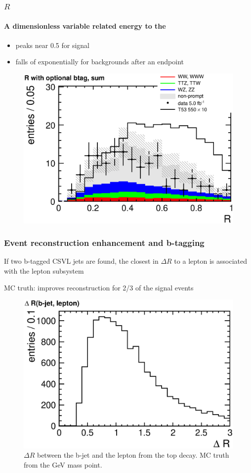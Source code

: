 \documentclass[ukenglish]{beamer}
\begin{document}
\begin{frame}
    \frametitle{$R$}
    \framesubtitle{A dimensionless variable related energy to the \met}
    \begin{itemize}
        \item peaks near 0.5 for signal
        \item falls of exponentially for backgrounds after an endpoint
    \end{itemize}
        \begin{figure}[h]
            \centering
            \includegraphics[width=.7\textwidth]{r_optional_btag_sum.eps}
        \end{figure}
\end{frame}

\begin{frame}
    \frametitle{Event reconstruction enhancement and b-tagging}
    \alert{If two b-tagged CSVL jets are found, the closest in $\Delta R$ to
    a lepton is associated with the lepton subsystem}

    \alert{MC truth: improves reconstruction for 2/3 of the signal events}
    \begin{figure}[h]
        \centering
        \includegraphics[height=.6\textheight]{signal_mc_dr_jet_lepton.eps}
        \caption{$\Delta R$ between the b-jet and the lepton from the top
            decay. MC truth from the \unit[550]{GeV} mass point.}
    \end{figure}
\end{frame}
\end{document}

